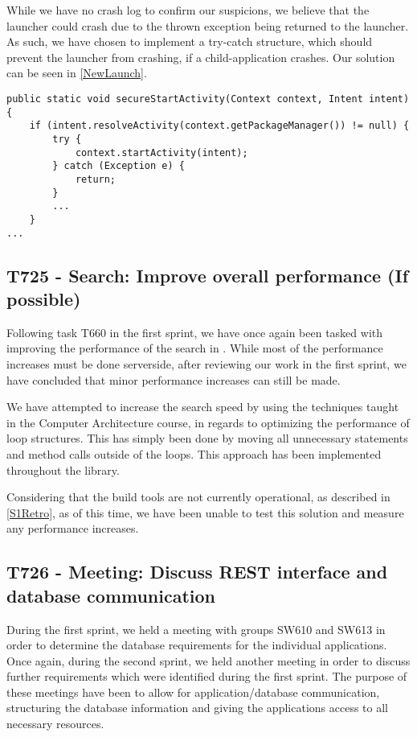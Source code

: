 While we have no crash log to confirm our suspicions, we believe that the
launcher could crash due to the thrown exception being returned to the launcher.
As such, we have chosen to implement a try-catch structure, which should prevent
the launcher from crashing, if a child-application crashes. Our solution can be 
seen in \autoref{NewLaunch}.\nl

\begin{minipage}[H]{\linewidth}
\begin{lstlisting}[caption = New approach to launching applications., label = NewLaunch] 
public static void secureStartActivity(Context context, Intent intent) {
	if (intent.resolveActivity(context.getPackageManager()) != null) {
    	try {
        	context.startActivity(intent);
        } catch (Exception e) {
        	return;
        }
        ...
    }
...
\end{lstlisting}
\end{minipage}

\subsection{T725 - Search: Improve overall performance (If possible)}
Following task T660 in the first sprint, we have once again been tasked with
improving the performance of the search in . While most
of the performance increases must be done serverside, after reviewing our work
in the first sprint, we have concluded that minor performance increases can
still be made.\nl

We have attempted to increase the search speed by using the techniques taught in
the Computer Architecture course, in regards to optimizing the performance of
loop structures. This has simply been done by moving all unnecessary statements
and method calls outside of the loops. This approach has been implemented
throughout the  library.\nl

Considering that the build tools are not currently operational, as described in
\autoref{S1Retro}, as of this time, we have been unable to test this solution
and measure any performance increases.

\subsection{T726 - Meeting: Discuss REST interface and database communication}
During the first sprint, we held a meeting with groups SW610 and SW613 in order
to determine the database requirements for the individual applications. Once
again, during the second sprint, we held another meeting in order to discuss
further requirements which were identified during the first sprint. The purpose
of these meetings have been to allow for application/database communication,
structuring the database information and giving the applications access to all
necessary resources.\nl

